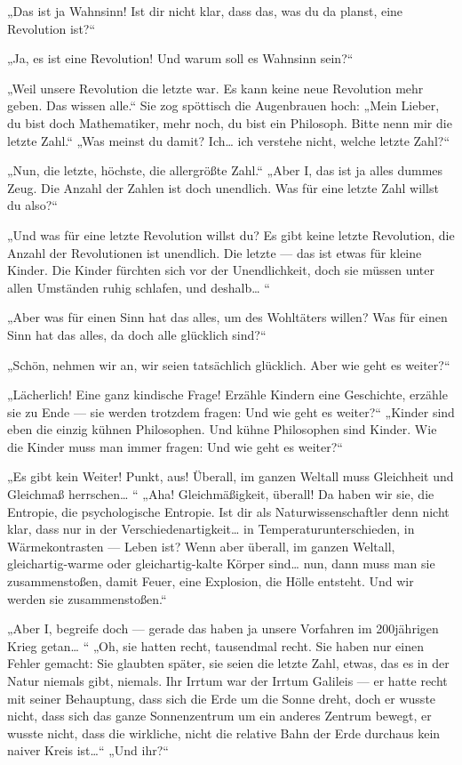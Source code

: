 „Das ist ja Wahnsinn! Ist dir nicht klar, dass das, was du da
planst, eine Revolution ist?“

„Ja, es ist eine Revolution! Und warum soll es Wahnsinn sein?“

„Weil unsere Revolution die letzte war. Es kann keine neue
Revolution mehr geben. Das wissen alle.“ Sie zog spöttisch die
Augenbrauen hoch: „Mein Lieber, du bist doch Mathematiker, mehr
noch, du bist ein Philosoph. Bitte nenn mir die letzte Zahl.“ „Was
meinst du damit? Ich\ldots{} ich verstehe nicht, welche letzte Zahl?“

„Nun, die letzte, höchste, die allergrößte Zahl.“ „Aber I, das ist
ja alles dummes Zeug. Die Anzahl der Zahlen ist doch unendlich. Was
für eine letzte Zahl willst du also?“

„Und was für eine letzte Revolution willst du? Es gibt keine letzte
Revolution, die Anzahl der Revolutionen ist unendlich. Die letzte —
das ist etwas für kleine Kinder. Die Kinder fürchten sich vor der
Unendlichkeit, doch sie müssen unter allen Umständen ruhig
schlafen, und deshalb\ldots{} “

„Aber was für einen Sinn hat das alles, um des Wohltäters willen?
Was für einen Sinn hat das alles, da doch alle glücklich sind?“

„Schön, nehmen wir an, wir seien tatsächlich glücklich. Aber wie
geht es weiter?“

„Lächerlich! Eine ganz kindische Frage! Erzähle Kindern eine
Geschichte, erzähle sie zu Ende — sie werden trotzdem fragen: Und
wie geht es weiter?“ „Kinder sind eben die einzig kühnen
Philosophen. Und kühne Philosophen sind Kinder. Wie die Kinder muss
man immer fragen: Und wie geht es weiter?“

„Es gibt kein Weiter! Punkt, aus! Überall, im ganzen Weltall muss
Gleichheit und Gleichmaß herrschen\ldots{} “ „Aha! Gleichmäßigkeit,
überall! Da haben wir sie, die Entropie, die psychologische
Entropie. Ist dir als Naturwissenschaftler denn nicht klar, dass
nur in der Verschiedenartigkeit\ldots{} in Temperaturunterschieden, in
Wärmekontrasten — Leben ist? Wenn aber überall, im ganzen Weltall,
gleichartig-warme oder gleichartig-kalte Körper sind\ldots{} nun, dann
muss man sie zusammenstoßen, damit Feuer, eine Explosion, die Hölle
entsteht. Und wir werden sie zusammenstoßen.“

„Aber I, begreife doch — gerade das haben ja unsere Vorfahren im
200jährigen Krieg getan\ldots{} “ „Oh, sie hatten recht, tausendmal
recht. Sie haben nur einen Fehler gemacht: Sie glaubten später, sie
seien die letzte Zahl, etwas, das es in der Natur niemals gibt,
niemals. Ihr Irrtum war der Irrtum Galileis — er hatte recht mit
seiner Behauptung, dass sich die Erde um die Sonne dreht, doch er
wusste nicht, dass sich das ganze Sonnenzentrum um ein anderes
Zentrum bewegt, er wusste nicht, dass die wirkliche, nicht die
relative Bahn der Erde durchaus kein naiver Kreis ist\ldots{}“ „Und
ihr?“

